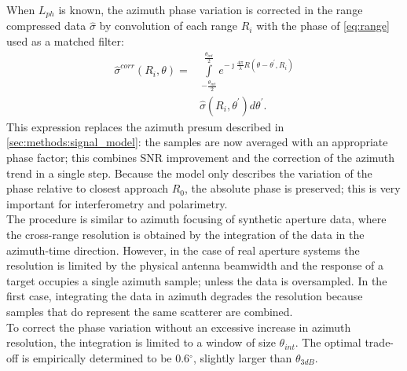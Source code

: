 When $L_{ph}$ is known, the azimuth phase variation is corrected in the range compressed data $\hat{\sigma}$ by convolution of each range $R_{i}$ with the phase of \eqref{eq:range} used as a matched filter:
\begin{equation}\label{eq:correction}
	\begin{aligned}
		\hat{\sigma}^{corr}\left(R_{i}, \theta\right) = &\int\limits_{-\frac{\theta_{int}}{2}}^{\frac{\theta_{int}}{2}}e^{-\jmath \frac{4\pi}{\lambda}R\left(\theta - \theta^{\prime}, R_{i}\right)}\\
		&\hat{\sigma}\left(R_{i}, \theta^\prime\right) d\theta^\prime.
	\end{aligned}
\end{equation}
This expression replaces the azimuth presum described in \autoref{sec:methods:signal_model}: the samples are now averaged with an appropriate phase factor; this combines SNR improvement and the correction of the azimuth trend in a single step. Because the model only describes the variation of the phase relative to closest approach $R_{0}$, the absolute phase is preserved; this is very important for interferometry and polarimetry.\\
The procedure is similar to azimuth focusing of synthetic aperture data, where the cross-range resolution is obtained by the integration of the data in the azimuth-time direction. However, in the case of real aperture systems the resolution is limited by the physical antenna beamwidth and the response of a target  occupies a single azimuth sample; unless the data is oversampled. In the first case, integrating the data in azimuth degrades the resolution because samples that do represent the same scatterer are combined.\\ To correct the phase variation without an excessive increase in azimuth resolution, the integration is limited to a window of size $\theta_{int}$. The optimal trade-off is empirically determined to be 0.6$^\circ$, slightly larger than $\theta_{3dB}$.
